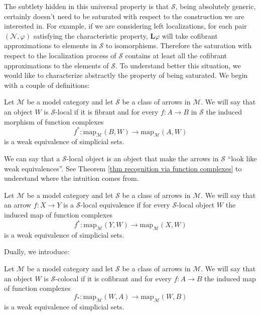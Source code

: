 The subtlety hidden in this universal property is that $\mathcal S$, being absolutely generic, certainly doesn't need to be saturated with respect to the construction we are interested in. For example, if we are considering left localizations, for each pair $(\mathcal N,\varphi)$ satisfying the characteristic property, $\mathbf L\varphi$ will take cofibrant approximations to elements in $\mathcal S$ to isomorphisms. Therefore the saturation with respect to the localization process of $\mathcal S$ contains at least all the cofibrant approximations to the elements of $\mathcal S$. To understand better this situation, we would like to characterize abstractly the property of being saturated. We begin with a couple of definitions:

\begin{defin}
Let $\mathcal M$ be a model category and let $\mathcal S$ be a class of arrows in $\mathcal M$. We will say that an object $W$ is $\mathcal S$-local if it is fibrant and for every $f \colon A \to B$ in $\mathcal S$ the induced morphism of function complexes
\[
f^* \colon \mathrm{map}_{\mathcal M}(B,W) \to \mathrm{map}_{\mathcal M}(A,W)
\]
is a weak equivalence of simplicial sets.
\end{defin}

\begin{rmk}
We can say that a $\mathcal S$-local object is an object that make the arrows in $\mathcal S$ ``look like weak equivalences''. See Theorem \ref{thm recognition via function complexes} to understand where the intuition comes from.
\end{rmk}

\begin{defin}
Let $\mathcal M$ be a model category and let $\mathcal S$ be a class of arrows in $\mathcal M$. We will say that an arrow $f \colon X \to Y$ is a $\mathcal S$-local equivalence if for every $\mathcal S$-local object $W$ the induced map of function complexes
\[
f^* \colon \mathrm{map}_{\mathcal M}(Y,W) \to \mathrm{map}_{\mathcal M}(X,W)
\]
is a weak equivalence of simplicial sets.
\end{defin}

Dually, we introduce:

\begin{defin}
Let $\mathcal M$ be a model category and let $\mathcal S$ be a class of arrows in $\mathcal M$. We will say that an object $W$ is $\mathcal S$-colocal if it is cofibrant and for every $f \colon A \to B$ the induced map of function complexes
\[
f_* \colon \mathrm{map}_{\mathcal M}(W,A) \to \mathrm{map}_{\mathcal M}(W,B)
\]
is a weak equivalence of simplicial sets.
\end{defin}

